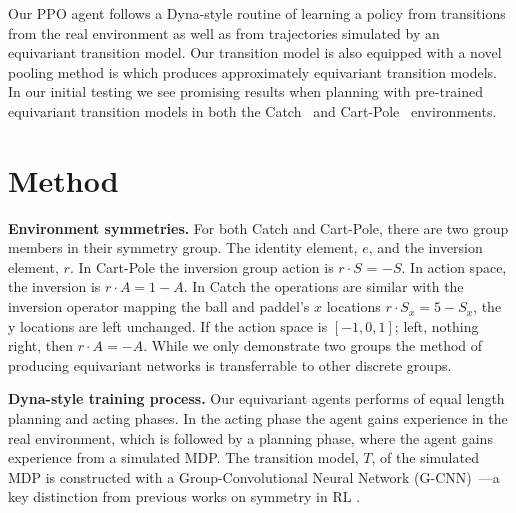 \documentclass[mlabstract]{jmlr}
\begin{document}
Our PPO agent follows a Dyna-style routine of learning a policy from transitions from the real environment as well as from trajectories simulated by an equivariant transition model. Our transition model is also equipped with a novel pooling method is which produces approximately equivariant transition models. In our initial testing we see promising results when planning with pre-trained equivariant transition models in both the Catch~\cite{osband2020bsuite} and Cart-Pole~\cite{barto1983neuronlike, florian2007correct} environments.

\vspace{-10}
\section{Method}
\indent \indent \textbf{Environment symmetries.} For both Catch and Cart-Pole, there are two group members in their symmetry group. The identity element, $e$, and the inversion element, $r$. In Cart-Pole the inversion group action is $r \cdot S$ = $ - S$. In action space, the inversion is $r \cdot A = 1 - A$. In Catch the operations are similar with the inversion operator mapping the ball and paddel's $x$ locations $r \cdot S_x = 5- S_x$, the y locations are left unchanged. If the action space is $[-1, 0, 1]$; left, nothing right, then $r \cdot A = - A$. While we only demonstrate two groups the method of producing equivariant networks is transferrable to other discrete groups.

\textbf{Dyna-style training process.} Our equivariant agents performs of equal length planning and acting phases. In the acting phase the agent gains experience in the real environment, which is followed by a planning phase, where the agent gains experience from a simulated MDP. The transition model, $T$, of the simulated MDP is constructed with a Group-Convolutional Neural Network (G-CNN)~\cite{cohen2016group}---a key distinction from previous works on symmetry in RL \cite{van2020mdp}.
\end{document}
